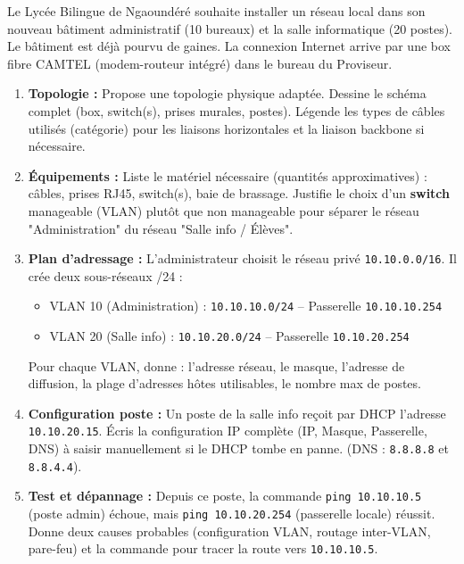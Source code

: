 \documentclass[11pt]{article}
\begin{document}
\begin{exercice}
Le Lycée Bilingue de Ngaoundéré souhaite installer un réseau local dans son nouveau bâtiment administratif (10 bureaux) et la salle informatique (20 postes). Le bâtiment est déjà pourvu de gaines. La connexion Internet arrive par une box fibre CAMTEL (modem-routeur intégré) dans le bureau du Proviseur.

\begin{enumerate}
    \item \textbf{Topologie :} Propose une topologie physique adaptée. Dessine le schéma complet (box, switch(s), prises murales, postes). Légende les types de câbles utilisés (catégorie) pour les liaisons horizontales et la liaison backbone si nécessaire.
    \item \textbf{Équipements :} Liste le matériel nécessaire (quantités approximatives) : câbles, prises RJ45, switch(s), baie de brassage. Justifie le choix d'un \textbf{switch} manageable (VLAN) plutôt que non manageable pour séparer le réseau "Administration" du réseau "Salle info / Élèves".
    \item \textbf{Plan d'adressage :} L'administrateur choisit le réseau privé \texttt{10.10.0.0/16}. Il crée deux sous-réseaux /24 :
    \begin{itemize}
        \item VLAN 10 (Administration) : \texttt{10.10.10.0/24} -- Passerelle \texttt{10.10.10.254}
        \item VLAN 20 (Salle info) : \texttt{10.10.20.0/24} -- Passerelle \texttt{10.10.20.254}
    \end{itemize}
    Pour chaque VLAN, donne : l'adresse réseau, le masque, l'adresse de diffusion, la plage d'adresses hôtes utilisables, le nombre max de postes.
    \item \textbf{Configuration poste :} Un poste de la salle info reçoit par DHCP l'adresse \texttt{10.10.20.15}. Écris la configuration IP complète (IP, Masque, Passerelle, DNS) à saisir manuellement si le DHCP tombe en panne. (DNS : \texttt{8.8.8.8} et \texttt{8.8.4.4}).
    \item \textbf{Test et dépannage :} Depuis ce poste, la commande \texttt{ping 10.10.10.5} (poste admin) échoue, mais \texttt{ping 10.10.20.254} (passerelle locale) réussit. Donne deux causes probables (configuration VLAN, routage inter-VLAN, pare-feu) et la commande pour tracer la route vers \texttt{10.10.10.5}.
\end{enumerate}
\end{exercice}
\end{document}

